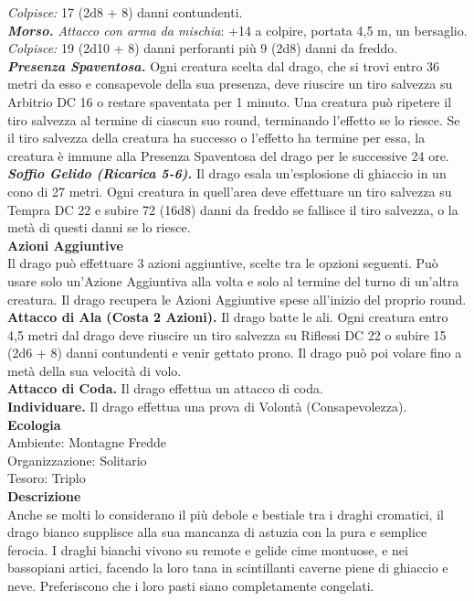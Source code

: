 \begin{multicols}{2}
\emph{Colpisce:} 17 (2d8 + 8) danni contundenti. \\
\emph{\textbf{Morso.} Attacco con arma da mischia}: +14 a colpire, portata 4,5 m, un bersaglio.\\
\emph{Colpisce:} 19 (2d10 + 8) danni perforanti più 9 (2d8) danni da freddo.\\
\emph{\textbf{Presenza Spaventosa.}} Ogni creatura scelta dal drago, che si trovi entro 36 metri da esso e consapevole della sua presenza, deve riuscire un tiro salvezza su Arbitrio DC 16 o restare spaventata per 1 minuto. Una creatura può ripetere il tiro salvezza al termine di ciascun suo round, terminando l'effetto se lo riesce. Se il tiro salvezza della creatura ha successo o l'effetto ha termine per essa, la creatura è immune alla Presenza Spaventosa del drago per le successive 24 ore.\\
\emph{\textbf{Soffio Gelido (Ricarica 5-6).}} Il drago esala un'esplosione di ghiaccio in un cono di 27 metri. Ogni creatura in quell'area deve effettuare un tiro salvezza su Tempra DC 22 e subire 72 (16d8) danni da freddo se fallisce il tiro salvezza, o la metà di questi danni se lo riesce.\\
\textbf{Azioni Aggiuntive}\\
Il drago può effettuare 3 azioni aggiuntive, scelte tra le opzioni seguenti. Può usare solo un'Azione Aggiuntiva alla volta e solo al termine del turno di un'altra creatura. Il drago recupera le Azioni Aggiuntive spese all'inizio del proprio round.\\
\textbf{Attacco di Ala (Costa 2 Azioni).} Il drago batte le ali. Ogni creatura entro 4,5 metri dal drago deve riuscire un tiro salvezza su Riflessi DC 22 o subire 15 (2d6 + 8) danni contundenti e venir gettato prono. Il drago può poi volare fino a metà della sua velocità di volo.\\
\textbf{Attacco di Coda.} Il drago effettua un attacco di coda.\\
\textbf{Individuare.} Il drago effettua una prova di Volontà (Consapevolezza).\\
\textbf{Ecologia}\\
Ambiente: Montagne Fredde\\
Organizzazione: Solitario\\
Tesoro: Triplo\\
\textbf{Descrizione}\\
Anche se molti lo considerano il più debole e bestiale tra i draghi cromatici, il drago bianco supplisce alla sua mancanza di astuzia con la pura e semplice ferocia. I draghi bianchi vivono su remote e gelide cime montuose, e nei bassopiani artici, facendo la loro tana in scintillanti caverne piene di ghiaccio e neve. Preferiscono che i loro pasti siano completamente congelati.\\



\end{multicols}
